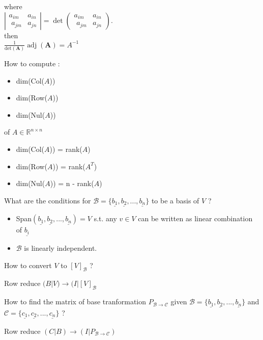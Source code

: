 \documentclass[12pt]{article}
\newcommand*{\xfield}[1]{\begin{mdframed}\centering #1\end{mdframed}\bigskip}
\newenvironment{note}{}{}
\begin{document}
\begin{note}
{where\\
$\left| \begin{matrix} a_{im} & a_{in} \\ \,\,a_{jm} & a_{jn} \end{matrix} \right|=
\det\left(    \begin{matrix} a_{im} & a_{in} \\ \,\,a_{jm} & a_{jn} \end{matrix} \right)$.\\
then\\
$\frac{1}{\text{det}(\mathbf{A})}\operatorname{adj}(\mathbf{A})= A^{-1}$ 
}
\end{note}

\begin{note}
	\xfield{How to compute :
	\begin{itemize}
		\item dim(Col($A$))
		\item dim(Row($A$))
		\item dim(Nul($A$))
	\end{itemize}
	of $A \in \mathbb{R}^{n\times n}$ }
	\xfield{\begin{itemize}
		\item dim(Col($A$)) = rank($A$)
		\item dim(Row($A$)) = rank($A^T$)
		\item dim(Nul($A$)) = n - rank($A$)
	\end{itemize}}
\end{note}

\begin{note}
	\xfield{What are the conditions for $\mathcal{B} = \{ \underline{b_1},\underline{b_2},...,\underline{b_n}\}$ to be a basis of $V$ ?}
	\xfield{\begin{itemize}
	\item Span$(\underline{b_1},\underline{b_2},...,\underline{b_n}) = V$ s.t. any $v \in V$ can be written as linear combination of $\underline{b_i}$
	\item $\mathcal{B}$ is linearly independent.
	\end{itemize} }
\end{note}

\begin{note}
	\xfield{How to convert $V$ to $[V]_\mathcal{B}$ ?}
	\xfield{Row reduce $(B|V) \rightarrow (I|[V]_\mathcal{B}$}
\end{note}

\begin{note}
	\xfield{How to find the matrix of base tranformation $P_{\mathcal{B}\rightarrow\mathcal{C}}$ given $\mathcal{B} = \{ \underline{b_1},\underline{b_2},...,\underline{b_n}\}$ and $\mathcal{C} = \{ \underline{c_1},\underline{c_2},...,\underline{c_n}\}$ ?}
	\xfield{Row reduce $(C|B) \rightarrow (I|P_{\mathcal{B}\rightarrow\mathcal{C}})$}
\end{note}
\end{document}
